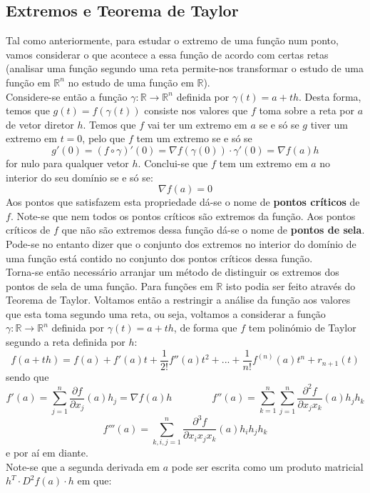 \documentclass{article}
\begin{document}
\subsection{Extremos e Teorema de Taylor}
Tal como anteriormente, para estudar o extremo de uma função num ponto, vamos considerar o que acontece a essa função de acordo com certas retas (analisar uma função segundo uma reta permite-nos transformar o estudo de uma função em $\mathbb{R}^n$ no estudo de uma função em $\mathbb{R}$).\\
Considere-se então a função $\gamma: \mathbb{R} \to \mathbb{R}^n$ definida por $\gamma (t) = a + th$. Desta forma, temos que $g(t) = f(\gamma(t))$ consiste nos valores que $f$ toma sobre a reta por $a$ de vetor diretor $h$. Temos que $f$ vai ter um extremo em $a$ se e só se $g$ tiver um extremo em $t=0$, pelo que $f$ tem um extremo se e só se
$$
g'(0) = (f \circ \gamma )' (0) = \nabla f(\gamma (0)) \cdot \gamma'(0) = \nabla f(a) h
$$
for nulo para qualquer vetor $h$. Conclui-se que $f$ tem um extremo em $a$ no interior do seu domínio se e só se:
$$
\nabla f(a)=0
$$
Aos pontos que satisfazem esta propriedade dá-se o nome de \textbf{pontos críticos} de $f$. Note-se que nem todos os pontos críticos são extremos da função. Aos pontos críticos de $f$ que não são extremos dessa função dá-se o nome de \textbf{pontos de sela}. Pode-se no entanto dizer que o conjunto dos extremos no interior do domínio de uma função está contido no conjunto dos pontos críticos dessa função.\\
Torna-se então necessário arranjar um método de distinguir os extremos dos pontos de sela de uma função. Para funções em $\mathbb{R}$ isto podia ser feito através do Teorema de Taylor. Voltamos então a restringir a análise da função aos valores que esta toma segundo uma reta, ou seja, voltamos a considerar a função $\gamma: \mathbb{R} \to \mathbb{R}^n$ definida por $\gamma (t) = a + th$, de forma que $f$ tem polinómio de Taylor segundo a reta definida por $h$:
$$
f(a+th) = f(a) + f'(a)t + \frac{1}{2!}f''(a)t^2 + ... + \frac{1}{n!} f^{(n)}(a)t^n + r_{n+1}(t)
$$
sendo que
$$
f'(a) = \sum_{j=1}^n \frac{\partial f}{\partial x_j}(a) h_j = \nabla f(a) h  \quad \quad \quad \quad 
f''(a) = \sum_{k=1}^n \sum_{j=1}^n \frac{\partial ^2 f}{\partial x_j x_k} (a) h_j h_k 
$$
$$
f'''(a) = \sum_{k,i,j =1}^n \frac{\partial ^3 f}{\partial x_i x_j x_k} (a) h_i h_j h_k
$$
e por aí em diante.\\
Note-se que a segunda derivada em $a$ pode ser escrita como um produto matricial $h^T \cdot D^2 f(a) \cdot h$ em que:
\end{document}
